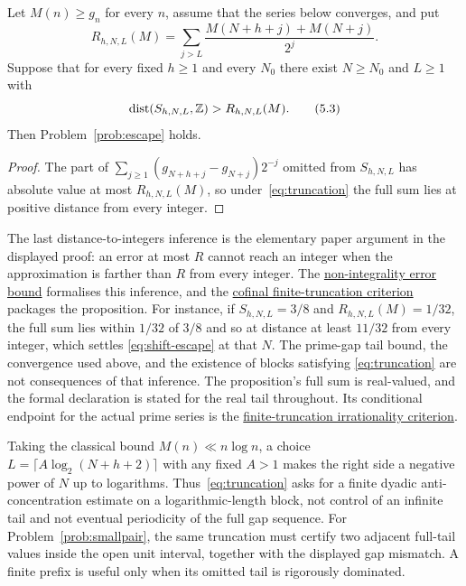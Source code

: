\documentclass[11pt]{article}
\begin{document}
\begin{proposition}\label{res:truncation}
Let $M(n)\ge g_n$ for every $n$, assume that the series below converges, and
put
\[
 R_{h,N,L}(M)=
 \sum_{j>L}\frac{M(N+h+j)+M(N+j)}{2^j}.
\]
Suppose that for every fixed $h\ge1$ and every $N_0$ there exist $N\ge N_0$ and
$L\ge1$ with
\[
 \operatorname{dist}(S_{h,N,L},\Z)>R_{h,N,L}(M).
\tag{5.3}\label{eq:truncation}
\]
Then Problem~\ref{prob:escape} holds.
\end{proposition}

\begin{proof}
The part of $\sum_{j\ge1}(g_{N+h+j}-g_{N+j})2^{-j}$ omitted from $S_{h,N,L}$
has absolute value at most $R_{h,N,L}(M)$, so under~\eqref{eq:truncation} the
full sum lies at positive distance from every integer.
\end{proof}

\noindent The last distance-to-integers inference is the elementary paper
argument in the displayed proof: an error at most $R$ cannot reach an integer
when the approximation is farther than $R$ from every integer.  The \href{https://github.com/wcook04/plectis-erdos/blob/f36a98bf3d3e6f65f1074e3b800e3293d5b8a51a/ErdosProblems/Erdos251/PaperTailBoundsR7.lean#L203}{non-integrality error bound}
formalises this inference, and the \href{https://github.com/wcook04/plectis-erdos/blob/f36a98bf3d3e6f65f1074e3b800e3293d5b8a51a/ErdosProblems/Erdos251/PaperTailBoundsR7.lean#L261}{cofinal finite-truncation criterion}
packages the proposition.  For instance, if
$S_{h,N,L}=3/8$ and $R_{h,N,L}(M)=1/32$, the full sum lies within $1/32$ of
$3/8$ and so at distance at least $11/32$ from every integer, which settles
\eqref{eq:shift-escape} at that $N$.  The prime-gap tail
bound, the convergence used above, and the existence of blocks satisfying
\eqref{eq:truncation} are not consequences of that inference.  The
proposition's full sum is real-valued, and the formal declaration is stated
for the real tail throughout.  Its conditional endpoint for the actual prime
series is the \href{https://github.com/wcook04/plectis-erdos/blob/f36a98bf3d3e6f65f1074e3b800e3293d5b8a51a/ErdosProblems/Erdos251/PaperTailBoundsR7.lean#L273}{finite-truncation irrationality criterion}.

\noindent Taking the classical bound $M(n)\ll n\log n$, a choice
$L=\lceil A\log_2(N+h+2)\rceil$ with any fixed $A>1$ makes the right side a
negative power of $N$ up to logarithms.  Thus~\eqref{eq:truncation} asks for a finite
dyadic anti-concentration estimate on a logarithmic-length block, not control
of an infinite tail and not eventual periodicity of the full gap sequence.
For Problem~\ref{prob:smallpair}, the same truncation must certify two adjacent
full-tail values inside the open unit interval, together with the displayed
gap mismatch.  A finite prefix is useful only when its omitted tail is
rigorously dominated.
\end{document}
